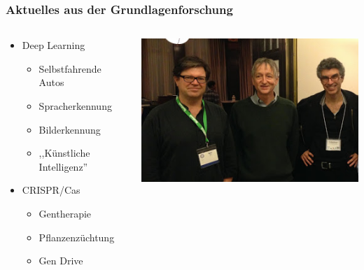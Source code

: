 \documentclass[14pt]{beamer}
\begin{document}
\begin{frame}
	\frametitle{Aktuelles aus der Grundlagenforschung}
	\begin{center}
		\begin{columns}
			\begin{column}{0.6\textwidth}
		\begin{itemize}
			\item {\large Deep Learning}
				\begin{itemize}
					\item Selbstfahrende Autos
					\item Spracherkennung
					\item Bilderkennung
					\item ,,Künstliche Intelligenz''
				\end{itemize}
				\vspace{1em}
			\item {\large CRISPR/Cas}
				\begin{itemize}
					\item Gentherapie
					\item Pflanzenzüchtung
					\item Gen Drive
				\end{itemize}
		\end{itemize}
			\end{column}
			\begin{column}{0.4\textwidth}
		\includegraphics[height=0.3\textheight]{dl_people.png}\\
				\vspace{1em}

\end{column}
\end{columns}
\end{center}
\end{frame}
\end{document}
